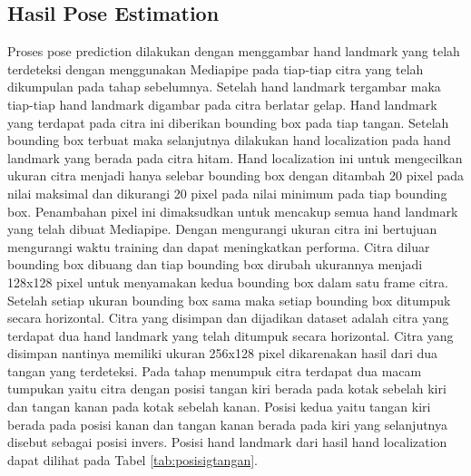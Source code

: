 \documentclass[conference]{IEEEtran}
\begin{document}
\subsection{Hasil Pose Estimation}
Proses pose prediction dilakukan dengan menggambar hand landmark yang telah terdeteksi dengan menggunakan Mediapipe pada tiap-tiap citra yang telah dikumpulan pada tahap sebelumnya. Setelah hand landmark tergambar maka tiap-tiap hand landmark digambar pada citra berlatar gelap. Hand landmark yang terdapat pada citra ini diberikan bounding box pada tiap tangan. Setelah bounding box terbuat maka selanjutnya dilakukan hand localization pada hand landmark yang berada pada citra hitam. Hand localization ini untuk mengecilkan ukuran citra menjadi hanya selebar bounding box dengan ditambah 20 pixel pada nilai maksimal dan dikurangi 20 pixel pada nilai minimum pada tiap bounding box. Penambahan pixel ini dimaksudkan untuk mencakup semua hand landmark yang telah dibuat Mediapipe. Dengan mengurangi ukuran citra ini bertujuan mengurangi waktu training dan dapat meningkatkan performa. Citra diluar bounding box dibuang dan tiap bounding box dirubah ukurannya menjadi 128x128 pixel untuk menyamakan kedua bounding box dalam satu frame citra. Setelah setiap ukuran bounding box sama maka setiap bounding box ditumpuk secara horizontal. Citra yang disimpan dan dijadikan dataset adalah citra yang terdapat dua hand landmark yang telah ditumpuk secara horizontal. Citra yang disimpan nantinya memiliki ukuran 256x128 pixel dikarenakan hasil dari dua tangan yang terdeteksi. Pada tahap menumpuk citra terdapat dua macam tumpukan yaitu citra dengan posisi tangan kiri berada pada kotak sebelah kiri dan tangan kanan pada kotak sebelah kanan. Posisi kedua yaitu tangan kiri berada pada posisi kanan dan tangan kanan berada pada kiri yang selanjutnya disebut sebagai posisi invers. Posisi hand landmark dari hasil hand localization dapat dilihat pada Tabel \ref{tab:posisigtangan}.
\end{document}
